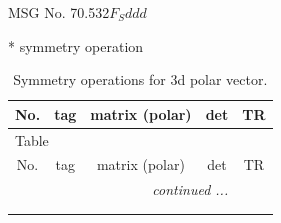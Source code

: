 \documentclass[fleqn,8pt]{jsarticle}
\begin{document}
\setcounter{MaxMatrixCols}{32}

\renewcommand{\tablename}{Table~}
\renewcommand{\figurename}{Figure~}
\begin{center}
\LARGE
MSG No. 70.532\quad$F_{S}ddd$
\end{center}
* symmetry operation
\renewcommand{\arraystretch}{1.3}
\begin{longtable}{ccccc}
\caption{Symmetry operations for 3d polar vector.}
 \\
 \hline \hline
No. & tag & matrix (polar) & det & TR \\ \hline \endfirsthead

\multicolumn{4}{l}{\tablename\ \thetable{}} \\
 \hline \hline
No. & tag & matrix (polar) & det & TR \\ \hline \endhead

 \hline \hline
\multicolumn{4}{r}{\footnotesize\it continued ...} \\ \endfoot

 \hline \hline
\multicolumn{4}{r}{} \\ \endlastfoot


\end{longtable}
\end{document}
